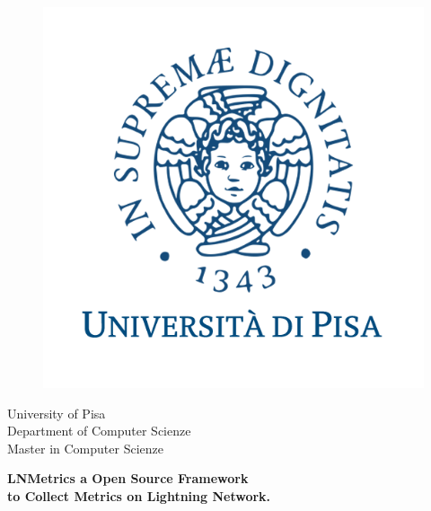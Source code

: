 \begin{titlepage}
\begin{figure}[!htb]
    \centering
    \includegraphics[keepaspectratio=true,scale=0.45]{format/img/unipi.png}
\end{figure}

\begin{center}
    \LARGE{University of Pisa}
    \vspace{5mm}
    \\ \large{Department of Computer Scienze}
    \vspace{5mm}
    \\ \LARGE{Master in Computer Scienze}
\end{center}

\vspace{15mm}
\begin{center}
    {\LARGE{\bf LNMetrics a Open Source Framework\\ \vspace{5mm} to Collect Metrics on Lightning Network. }}
    
    
\end{center}
\vspace{30mm}


\end{titlepage}
